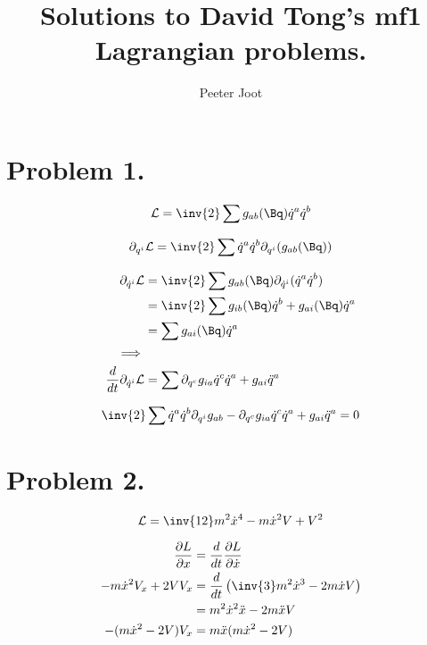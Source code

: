 \documentclass{article}
\title{ Solutions to David Tong's mf1 Lagrangian problems. } %
\author{Peeter Joot}         %
\date{}        %
\newcommand{\LL}[0]{\mathcal{L}}
\newcommand{\xdot}[0]{\dot{x}}
\newcommand{\xddot}[0]{\ddot{x}}
\newcommand{\qdot}[0]{\dot{q}}
\newcommand{\qddot}[0]{\ddot{q}}
\begin{document}
             

\maketitle{}

\section{ Problem 1. }

\begin{equation*}
\LL = \inv{2} \sum  g_{ab}(\Bq) \qdot^a \qdot^b
\end{equation*}

\begin{equation*}
\partial_{q^i} \LL = \inv{2} \sum \qdot^a \qdot^b \partial_{q^i}(g_{ab}(\Bq))
\end{equation*}

\begin{align*}
\partial_{\qdot^i} \LL
&= \inv{2} \sum g_{ab}(\Bq) \partial_{\qdot^i}( \qdot^a \qdot^b ) \\
&= \inv{2} \sum g_{ib}(\Bq) \qdot^b + g_{ai}(\Bq) \qdot^a \\
&= \sum g_{ai}(\Bq) \qdot^a \\
\implies \\
\frac{d}{dt} \partial_{\qdot^i} \LL &= \sum \partial_{q^c} g_{ia} \qdot^c \qdot^a + g_{ai} \qddot^a \\
\end{align*}

\begin{equation*}
\inv{2} \sum \qdot^a \qdot^b \partial_{q^i}g_{ab} - \partial_{q^c} g_{ia} \qdot^c \qdot^a + g_{ai} \qddot^a = 0
\end{equation*}

\section{ Problem 2. }

\begin{equation*}
\LL = \inv{12}m^2 \xdot^4 - m \xdot^2 V + V^2
\end{equation*}

\begin{align*}
\frac{\partial L}{\partial x} &= \frac{d}{dt} \frac{\partial L}{\partial \xdot} \\
-m \xdot^2 V_x + 2V V_x &= \frac{d}{dt} \left( \inv{3}m^2 \xdot^3 - 2 m \xdot V \right) \\
                        &= m^2 \xdot^2 \xddot - 2m \xddot V \\
-(m \xdot^2 -2V) V_x    &= m \xddot (m \xdot^2 - 2 V) \\
\end{align*}
\end{document}

